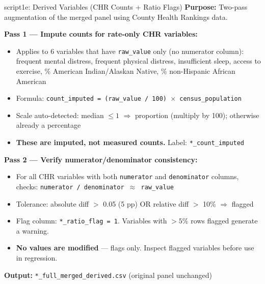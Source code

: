 \documentclass[aspectratio=169]{beamer}
\begin{document}
\begin{frame}{script1e: Derived Variables (CHR Counts + Ratio Flags)}
\textbf{Purpose:} Two-pass augmentation of the merged panel using County Health Rankings data.

\vspace{0.5em}
\textbf{Pass 1 — Impute counts for rate-only CHR variables:}
\begin{itemize}\small
    \item Applies to 6 variables that have \texttt{raw\_value} only (no numerator column): frequent mental distress, frequent physical distress, insufficient sleep, access to exercise, \% American Indian/Alaskan Native, \% non-Hispanic African American
    \item Formula: \texttt{count\_imputed = (raw\_value / 100) $\times$ census\_population}
    \item Scale auto-detected: median $\leq 1$ $\Rightarrow$ proportion (multiply by 100); otherwise already a percentage
    \item \textbf{These are imputed, not measured counts.} Label: \texttt{*\_count\_imputed}
\end{itemize}

\vspace{0.3em}
\textbf{Pass 2 — Verify numerator/denominator consistency:}
\begin{itemize}\small
    \item For all CHR variables with both \texttt{numerator} and \texttt{denominator} columns, checks: \texttt{numerator / denominator $\approx$ raw\_value}
    \item Tolerance: absolute diff $>$ 0.05 (5 pp) OR relative diff $>$ 10\% $\Rightarrow$ flagged
    \item Flag column: \texttt{*\_ratio\_flag = 1}. Variables with $>5\%$ rows flagged generate a warning.
    \item \textbf{No values are modified} — flags only. Inspect flagged variables before use in regression.
\end{itemize}

\textbf{Output:} \texttt{*\_full\_merged\_derived.csv} (original panel unchanged)
\end{frame}
\end{document}

